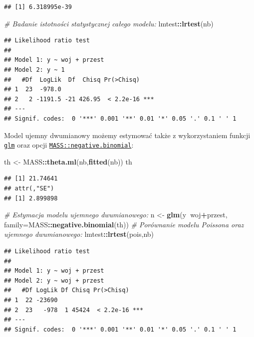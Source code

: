 \documentclass[polish,]{book}
\newenvironment{Shaded}{\begin{snugshade}}{\end{snugshade}}
\newcommand{\CommentTok}[1]{\textcolor[rgb]{0.56,0.35,0.01}{\textit{#1}}}
\newcommand{\DataTypeTok}[1]{\textcolor[rgb]{0.13,0.29,0.53}{#1}}
\newcommand{\KeywordTok}[1]{\textcolor[rgb]{0.13,0.29,0.53}{\textbf{#1}}}
\newcommand{\NormalTok}[1]{#1}
\newcommand{\OperatorTok}[1]{\textcolor[rgb]{0.81,0.36,0.00}{\textbf{#1}}}
\newcommand{\StringTok}[1]{\textcolor[rgb]{0.31,0.60,0.02}{#1}}
\begin{document}
\begin{verbatim}
## [1] 6.318995e-39
\end{verbatim}

\begin{Shaded}
\begin{Highlighting}[]
\CommentTok{# Badanie istotności statystycznej całego modelu:}
\NormalTok{lmtest}\OperatorTok{::}\KeywordTok{lrtest}\NormalTok{(nb)}
\end{Highlighting}
\end{Shaded}

\begin{verbatim}
## Likelihood ratio test
## 
## Model 1: y ~ woj + przest
## Model 2: y ~ 1
##   #Df  LogLik  Df  Chisq Pr(>Chisq)    
## 1  23  -978.0                          
## 2   2 -1191.5 -21 426.95  < 2.2e-16 ***
## ---
## Signif. codes:  0 '***' 0.001 '**' 0.01 '*' 0.05 '.' 0.1 ' ' 1
\end{verbatim}

Model ujemny dwumianowy możemy estymować także z wykorzystaniem funkcji
\href{https://rdrr.io/r/stats/glm.html}{\texttt{glm}} oraz opcji \href{https://rdrr.io/cran/MASS/man/negative.binomial.html}{\texttt{MASS::negative.binomial}}:

\begin{Shaded}
\begin{Highlighting}[]
\NormalTok{th <-}\StringTok{ }\NormalTok{MASS}\OperatorTok{::}\KeywordTok{theta.ml}\NormalTok{(nb,}\KeywordTok{fitted}\NormalTok{(nb))}
\NormalTok{th}
\end{Highlighting}
\end{Shaded}

\begin{verbatim}
## [1] 21.74641
## attr(,"SE")
## [1] 2.899898
\end{verbatim}

\begin{Shaded}
\begin{Highlighting}[]
\CommentTok{# Estymacja modelu ujemnego dwumianowego:}
\NormalTok{n <-}\StringTok{ }\KeywordTok{glm}\NormalTok{(y}\OperatorTok{~}\NormalTok{woj}\OperatorTok{+}\NormalTok{przest, }\DataTypeTok{family=}\NormalTok{MASS}\OperatorTok{::}\KeywordTok{negative.binomial}\NormalTok{(th))}
\CommentTok{# Porównanie modelu Poissona oraz ujemnego dwumianowego:}
\NormalTok{lmtest}\OperatorTok{::}\KeywordTok{lrtest}\NormalTok{(pois,nb)}
\end{Highlighting}
\end{Shaded}

\begin{verbatim}
## Likelihood ratio test
## 
## Model 1: y ~ woj + przest
## Model 2: y ~ woj + przest
##   #Df LogLik Df Chisq Pr(>Chisq)    
## 1  22 -23690                        
## 2  23   -978  1 45424  < 2.2e-16 ***
## ---
## Signif. codes:  0 '***' 0.001 '**' 0.01 '*' 0.05 '.' 0.1 ' ' 1
\end{verbatim}
\end{document}
